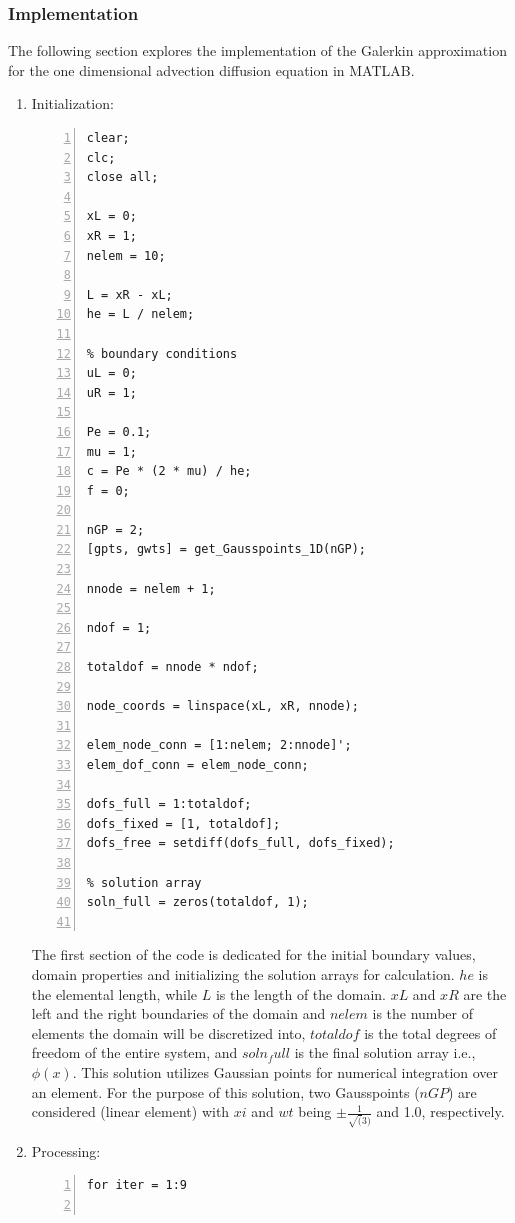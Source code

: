 \documentclass[12pt, oneside]{article}
\begin{document}
\subsubsection{Implementation}
The following section explores the implementation of the Galerkin approximation for the one dimensional advection diffusion equation in MATLAB.
\begin{enumerate}
    \item Initialization:
	\begin{lstlisting}[frame=single, numbers=left, style=Matlab-editor]
	    %% 1D steady state advection diffusion
clear;
clc;
close all;

xL = 0;
xR = 1;
nelem = 10;

L = xR - xL;
he = L / nelem;

% boundary conditions
uL = 0;
uR = 1;

Pe = 0.1;
mu = 1;
c = Pe * (2 * mu) / he;
f = 0;

nGP = 2;
[gpts, gwts] = get_Gausspoints_1D(nGP);

nnode = nelem + 1;

ndof = 1;

totaldof = nnode * ndof;

node_coords = linspace(xL, xR, nnode);

elem_node_conn = [1:nelem; 2:nnode]';
elem_dof_conn = elem_node_conn;

dofs_full = 1:totaldof;
dofs_fixed = [1, totaldof];
dofs_free = setdiff(dofs_full, dofs_fixed);

% solution array
soln_full = zeros(totaldof, 1);
	
	\end{lstlisting}
	The first section of the code is dedicated for the initial boundary values, domain properties and initializing the solution arrays for calculation. $he$ is the elemental length, while $L$ is the length of the domain. $xL$ and $xR$ are the left and the right boundaries of the domain and $nelem$ is the number of elements the domain will be discretized into, $totaldof$ is the total degrees of freedom of the entire system, and $soln_full$ is the final solution array i.e., $\phi(x)$. This solution utilizes Gaussian points for numerical integration over an element. For the purpose of this solution, two Gausspoints ($nGP$) are considered (linear element) with $xi$ and $wt$ being $\pm \frac{1}{\sqrt(3)}$ and 1.0, respectively. 
	\item Processing:
	   \begin{lstlisting}[frame=single, numbers=left, style=Matlab-editor]
%% Processing
for iter = 1:9


\end{lstlisting}
\end{enumerate}
\end{document}
